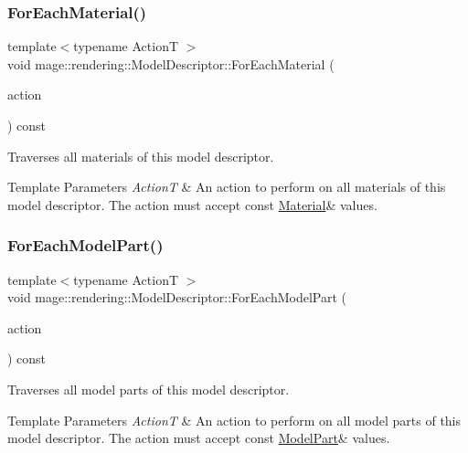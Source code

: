 \subsubsection{\texorpdfstring{For\+Each\+Material()}{ForEachMaterial()}}
{\footnotesize\ttfamily template$<$typename ActionT $>$ \\
void mage\+::rendering\+::\+Model\+Descriptor\+::\+For\+Each\+Material (\begin{DoxyParamCaption}\item[{ActionT \&\&}]{action }\end{DoxyParamCaption}) const}

Traverses all materials of this model descriptor.


\begin{DoxyTemplParams}{Template Parameters}
{\em ActionT} & An action to perform on all materials of this model descriptor. The action must accept {\ttfamily const} {\ttfamily \mbox{\hyperlink{classmage_1_1rendering_1_1_material}{Material}}\&} values. \\
\hline
\end{DoxyTemplParams}
\mbox{\label{classmage_1_1rendering_1_1_model_descriptor_a9b217d2536bdd34c4b8b93ccf2ef62d3}} 
\subsubsection{\texorpdfstring{For\+Each\+Model\+Part()}{ForEachModelPart()}}
{\footnotesize\ttfamily template$<$typename ActionT $>$ \\
void mage\+::rendering\+::\+Model\+Descriptor\+::\+For\+Each\+Model\+Part (\begin{DoxyParamCaption}\item[{ActionT \&\&}]{action }\end{DoxyParamCaption}) const}

Traverses all model parts of this model descriptor.


\begin{DoxyTemplParams}{Template Parameters}
{\em ActionT} & An action to perform on all model parts of this model descriptor. The action must accept {\ttfamily const} {\ttfamily \mbox{\hyperlink{structmage_1_1rendering_1_1_model_part}{Model\+Part}}\&} values. \\
\hline
\end{DoxyTemplParams}
\mbox{\label{classmage_1_1rendering_1_1_model_descriptor_a57a444cf8c1310ce8fa4b797055e0fd1}} 
